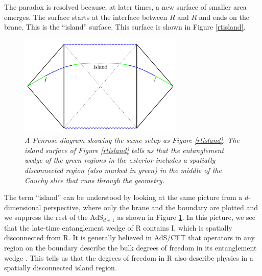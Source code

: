 \documentclass[12pt]{article}
\begin{document}
The paradox is resolved because, at later times, a new surface of smaller area emerges.  The surface starts at the interface between $R$ and $\widetilde{R}$ and ends on the brane. This is the ``island'' surface. This surface is shown in Figure \ref{rtisland}. 

\begin{figure}[!ht]
\begin{center}
\includegraphics[width=0.7\textwidth]{island.pdf}
\caption{\em A Penrose diagram showing the  same setup as Figure \ref{rtisland}. The island surface of Figure \ref{rtisland} tells us that the entanglement wedge of the green regions in the exterior includes a spatially disconnected region (also marked in green) in the middle of the Cauchy slice that runs through the geometry. \label{dualisland}}
\end{center}
\end{figure}

The term ``island'' can be understood by looking at the same picture from a  $d$-dimensional perspective, where only the brane and the boundary are plotted and we suppress the rest of the AdS$_{d+1}$ as shown in Figure \ref{dualisland}. In this picture, we see that the late-time entanglement wedge of R contains I, which is spatially disconnected from R. It is generally believed in AdS/CFT that operators in any region on the boundary describe the bulk degrees of freedom in its entanglement wedge \cite{Czech:2012bh,Dong:2016eik}. This tells us that the degrees of freedom in R also describe physics in a spatially disconnected island region. 










 
\end{document}
